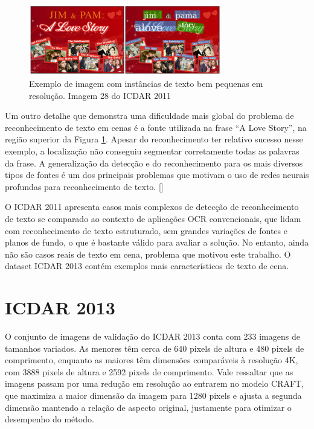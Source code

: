 \begin{figure}
    \centering
    \includegraphics[width=0.75\textwidth]{figs/resultados-icdar11-03.png}
    \caption{Exemplo de imagem com instâncias de texto bem pequenas em resolução. Imagem 28 do ICDAR 2011}
    \label{fig:results_icdar11_03}
\end{figure}

Um outro detalhe que demonstra uma dificuldade mais global do problema de reconhecimento de texto em cenas é a fonte utilizada na frase “A Love Story”, na região superior da Figura \ref{fig:results_icdar11_03}. Apesar do reconhecimento ter relativo sucesso nesse exemplo, a localização não conseguiu segmentar corretamente todas as palavras da frase. A generalização da detecção e do reconhecimento para os mais diversos tipos de fontes é um dos principais problemas que motivam o uso de redes neurais profundas para reconhecimento de texto. []

O ICDAR 2011 apresenta casos mais complexos de detecção de reconhecimento de texto se comparado ao contexto de aplicações OCR convencionais, que lidam com reconhecimento de texto estruturado, sem grandes variações de fontes e planos de fundo, o que é bastante válido para avaliar a solução. No entanto, ainda não são casos reais de texto em cena, problema que motivou este trabalho. O dataset ICDAR 2013 contém exemplos mais característicos de texto de cena.


\section{ICDAR 2013}\label{sec:results_icdar_2013}

O conjunto de imagens de validação do ICDAR 2013 conta com 233 imagens de tamanhos variados. As menores têm cerca de 640 pixels de altura e 480 pixels de comprimento, enquanto as maiores têm dimensões comparáveis à resolução 4K, com 3888 pixels de altura e 2592 pixels de comprimento. Vale ressaltar que as imagens passam por uma redução em resolução ao entrarem no modelo CRAFT, que maximiza a maior dimensão da imagem para 1280 pixels e ajusta a segunda dimensão mantendo a relação de aspecto original, justamente para otimizar o desempenho do método.

